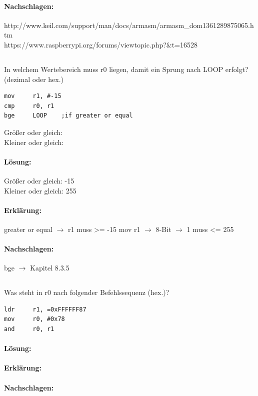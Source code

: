 \documentclass[12pt,twoside,a4paper]{article}
\begin{document}
\paragraph*{Nachschlagen:}
http://www.keil.com/support/man/docs/armasm/armasm_dom1361289875065.htm\\
https://www.raspberrypi.org/forums/viewtopic.php?&t=16528\\

\subsection{}
In welchem Wertebereich muss r0 liegen, damit ein Sprung nach LOOP erfolgt? (dezimal oder hex.)
\begin{lstlisting}
mov		r1, #-15
cmp		r0, r1
bge		LOOP	;if greater or equal
\end{lstlisting}

Größer oder gleich:\\
Kleiner oder gleich:\\

\paragraph*{Lösung:}
Größer oder gleich: -15\\
Kleiner oder gleich: 255\\

\paragraph*{Erklärung:}
greater or equal $\rightarrow$ r1 muss >= -15 
mov r1 $\rightarrow$ 8-Bit $\rightarrow$ 1 muss <= 255

\paragraph*{Nachschlagen:}
bge $\rightarrow$ Kapitel 8.3.5

\subsection{}
Was steht in r0 nach folgender Befehlssequenz (hex.)?
\begin{lstlisting}
ldr		r1, =0xFFFFFF87
mov		r0, #0x78
and		r0, r1
\end{lstlisting}




\paragraph*{Lösung:}

\paragraph*{Erklärung:}

\paragraph*{Nachschlagen:}
\end{document}
